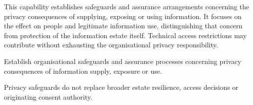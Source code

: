 This capability establishes safeguards and assurance arrangements concerning the privacy consequences of supplying, exposing or using information. It focuses on the effect on people and legitimate information use, distinguishing that concern from protection of the information estate itself. Technical access restrictions may contribute without exhausting the organisational privacy responsibility.



Establish organisational safeguards and assurance processes concerning privacy consequences of information supply, exposure or use.



Privacy safeguards do not replace broader estate resilience, access decisions or originating consent authority.


